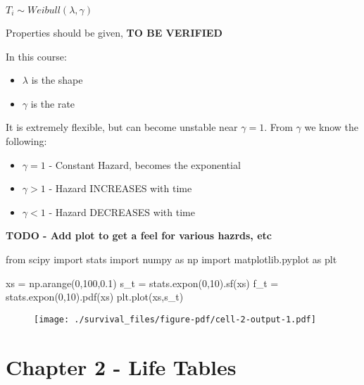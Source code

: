 \documentclass[
  letterpaper,
  DIV=11,
  numbers=noendperiod]{scrreprt}
\newenvironment{Shaded}{\begin{snugshade}}{\end{snugshade}}
\newcommand{\DecValTok}[1]{\textcolor[rgb]{0.68,0.00,0.00}{#1}}
\newcommand{\FloatTok}[1]{\textcolor[rgb]{0.68,0.00,0.00}{#1}}
\newcommand{\ImportTok}[1]{\textcolor[rgb]{0.00,0.46,0.62}{#1}}
\newcommand{\NormalTok}[1]{\textcolor[rgb]{0.00,0.23,0.31}{#1}}
\newcommand{\OperatorTok}[1]{\textcolor[rgb]{0.37,0.37,0.37}{#1}}
\providecommand{\tightlist}{%
  \setlength{\itemsep}{0pt}\setlength{\parskip}{0pt}}\usepackage{longtable,booktabs,array}
\begin{document}
\(T_i \sim Weibull(\lambda, \gamma)\)

Properties should be given, \textbf{TO BE VERIFIED}

In this course:

\begin{itemize}
\tightlist
\item
  \(\lambda\) is the shape
\item
  \(\gamma\) is the rate
\end{itemize}

It is extremely flexible, but can become unstable near \(\gamma = 1\).
From \(\gamma\) we know the following:

\begin{itemize}
\tightlist
\item
  \(\gamma = 1\) - Constant Hazard, becomes the exponential
\item
  \(\gamma > 1\) - Hazard INCREASES with time
\item
  \(\gamma < 1\) - Hazard DECREASES with time
\end{itemize}

\textbf{TODO - Add plot to get a feel for various hazrds, etc}

\begin{Shaded}
\begin{Highlighting}[]
\ImportTok{from}\NormalTok{ scipy }\ImportTok{import}\NormalTok{ stats}
\ImportTok{import}\NormalTok{ numpy }\ImportTok{as}\NormalTok{ np}
\ImportTok{import}\NormalTok{ matplotlib.pyplot }\ImportTok{as}\NormalTok{ plt}

\NormalTok{xs }\OperatorTok{=}\NormalTok{ np.arange(}\DecValTok{0}\NormalTok{,}\DecValTok{100}\NormalTok{,}\FloatTok{0.1}\NormalTok{)}
\NormalTok{s\_t }\OperatorTok{=}\NormalTok{ stats.expon(}\DecValTok{0}\NormalTok{,}\DecValTok{10}\NormalTok{).sf(xs)}
\NormalTok{f\_t }\OperatorTok{=}\NormalTok{ stats.expon(}\DecValTok{0}\NormalTok{,}\DecValTok{10}\NormalTok{).pdf(xs)}
\NormalTok{plt.plot(xs,s\_t)}
\end{Highlighting}
\end{Shaded}

\begin{figure}[H]

{\centering \texttt{[image: ./survival\_files/figure-pdf/cell-2-output-1.pdf]}

}

\end{figure}

\hypertarget{chapter-2---life-tables}{%
\section{Chapter 2 - Life Tables}\label{chapter-2---life-tables}}
\end{document}
